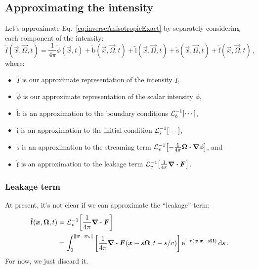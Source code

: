 \subsection{Approximating the intensity}
Let's approximate Eq.~\eqref{eq:inverseAnisotropicExact} by
separately considering each component of the intensity:
\begin{equation}\label{eq:approxIntensity1}
  \tilde I(\vec{x}, \vec{\Omega}, t)
  = \frac1{4\pi} \tilde \phi(\vec{x}, t) 
  + \mathrm{ \tilde b }(\vec{x}, \vec{\Omega}, t)
  + \mathrm{ \tilde i }(\vec{x}, \vec{\Omega}, t)
  + \mathrm{ \tilde s }(\vec{x}, \vec{\Omega}, t)
  + \mathrm{ \tilde f }(\vec{x}, \vec{\Omega}, t) \,,
\end{equation}
where:
\begin{itemize}
  \item $\tilde I$ is our approximate representation of the intensity $I$,
  \item $\tilde \phi$ is our approximate representation of the scalar intensity
    $\phi$,
  \item $\mathrm{ \tilde b }$ is an approximation to the boundary conditions
    $\mathcal{L}_{b}^{-1}\!\left[\cdots\right]$,
  \item $\mathrm{ \tilde i }$ is an approximation to the initial condition 
    $\mathcal{L}_{i}^{-1}\!\left[\cdots\right]$,
  \item $\mathrm{ \tilde s }$ is an approximation to the streaming term
    $\mathcal{L}_{v}^{-1}\!\left[ -\frac1{4\pi} \bm{\Omega}\bm{\cdot} \bm{\nabla} \phi \right]$, and
  \item $\mathrm{ \tilde f }$ is an approximation to the leakage term
    $\mathcal{L}_{v}^{-1}\!\left[ \frac1{4\pi} \bm{\nabla} \bm{\cdot} \bm{F} \right]$.
\end{itemize}

\subsubsection{Leakage term}
At present, it's not clear if we can approximate the ``leakage'' term:
\begin{align*}
  \mathrm{ \tilde f }(\bm{x}, \bm{\Omega}, t) &=
   \mathcal{L}_{v}^{-1}\!\left[ \frac1{4\pi}\bm{\nabla} \bm{\cdot} \bm{F} \right]
  \\
  &= \int_{0}^{\left\| \bm{x} - \bm{x}_b \right\|}
    \left[ \frac1{4\pi}\bm{\nabla} \bm{\cdot} \bm{F}(\bm{x} - s \bm{\Omega}, t-s/v)
    \right]
    \mathop{}\!\mathrm{e}^{ -\tau(\bm{x}, \bm{x} - s \bm{\Omega})}
    \mathop{}\!\mathrm{d} s \,.
\end{align*}
For now, we just discard it.

